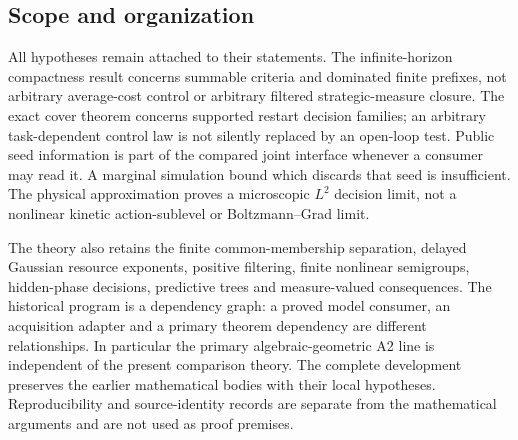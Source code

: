 \subsection{Scope and organization}
All hypotheses remain attached to their statements. The infinite-horizon
compactness result concerns summable criteria and dominated finite
prefixes, not arbitrary average-cost control or arbitrary filtered
strategic-measure closure. The exact cover theorem concerns supported
restart decision families; an arbitrary task-dependent control law is
not silently replaced by an open-loop test. Public seed information is
part of the compared joint interface whenever a consumer may read it.
A marginal simulation bound which discards that seed is insufficient.
The physical approximation proves a microscopic $L^2$ decision limit,
not a nonlinear kinetic action-sublevel or Boltzmann--Grad limit.

The theory also retains the finite common-membership separation, delayed
Gaussian resource exponents, positive filtering, finite nonlinear
semigroups, hidden-phase decisions, predictive trees and measure-valued
consequences. The historical program is a dependency graph: a proved
model consumer, an acquisition adapter and a primary theorem dependency
are different relationships. In particular the primary algebraic-geometric
A2 line is independent of the present comparison theory. The complete
development preserves the earlier mathematical bodies with their local
hypotheses. Reproducibility and source-identity records are separate from
the mathematical arguments and are not used as proof premises.
